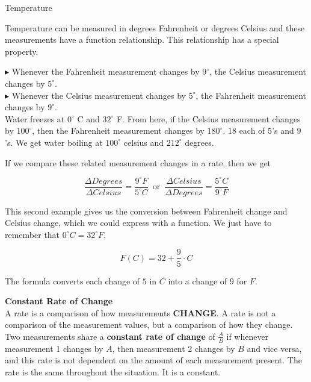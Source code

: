 \documentclass{ximera}
\begin{document}
\begin{example} Temperature


Temperature can be measured in degrees Fahrenheit or degrees Celsius and these measurements have a function relationship. This relationship has a special property.


$\blacktriangleright$ Whenever the Fahrenheit measurement changes by $9^{\circ}$, the Celsius measurement changes by $5^{\circ}$. \\
$\blacktriangleright$ Whenever the Celsius measurement changes by $5^{\circ}$, the Fahrenheit measurement changes by $9^{\circ}$. \\



Water freezes at $0^{\circ}$ C and $32^{\circ}$ F.  From here, if the Celsius measurement changes by $100^{\circ}$, then the Fahrenheit measurement changes by $180^{\circ}$.  $18$ each of $5$'s and $9$'s. We get water boiling at $100^{\circ}$ celsius and $212^{\circ}$ degrees.


If we compare these related measurement changes in a rate, then we get

\[
\frac{\Delta Degrees}{\Delta Celsius} = \frac{9^{\circ}F}{5^{\circ}C} \, \text{ or } \, \frac{\Delta Celsius}{\Delta Degrees} = \frac{5^{\circ}C}{9^{\circ}F}
\]


\end{example} 


This second example gives us the conversion between Fahrenheit change and Celsius change, which we could express with a function.  We just have to remember that $0^{\circ}C = 32^{\circ}F$.

\[
F(C) = 32 + \frac{9}{5} \cdot C
\]


The formula converts each change of $5$ in $C$ into a change of $9$ for $F$.







\begin{definition} \textbf{\textcolor{green!50!black}{Constant Rate of Change}} \\


A rate is a comparison of how measurements \textbf{\textcolor{purple!85!blue}{CHANGE}}. A rate is not a comparison of the measurement values, but a comparison of how they change. \\


Two measurements share a \textbf{constant rate of change} of $\tfrac{A}{B}$ if whenever measurement 1 changes by $A$, then measurement 2 changes by $B$ and vice versa, and this rate is not dependent on the amount of each measurement present.  The rate is the same throughout the situation.  It is a constant.




\end{definition}
\end{document}
